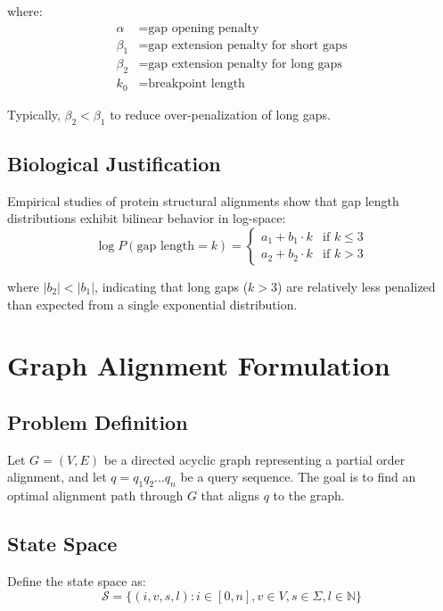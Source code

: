 \documentclass[11pt]{article}
\begin{document}
where:
\begin{align}
\alpha &= \text{gap opening penalty} \\
\beta_1 &= \text{gap extension penalty for short gaps} \\
\beta_2 &= \text{gap extension penalty for long gaps} \\
k_0 &= \text{breakpoint length}
\end{align}

Typically, $\beta_2 < \beta_1$ to reduce over-penalization of long gaps.

\subsection{Biological Justification}

Empirical studies of protein structural alignments show that gap length distributions exhibit bilinear behavior in log-space:
\begin{equation}
\log P(\text{gap length} = k) = \begin{cases}
a_1 + b_1 \cdot k & \text{if } k \leq 3 \\
a_2 + b_2 \cdot k & \text{if } k > 3
\end{cases}
\end{equation}

where $|b_2| < |b_1|$, indicating that long gaps ($k > 3$) are relatively less penalized than expected from a single exponential distribution.

\section{Graph Alignment Formulation}

\subsection{Problem Definition}

Let $G = (V, E)$ be a directed acyclic graph representing a partial order alignment, and let $q = q_1q_2...q_n$ be a query sequence. The goal is to find an optimal alignment path through $G$ that aligns $q$ to the graph.

\subsection{State Space}

Define the state space as:
\begin{equation}
\mathcal{S} = \{(i, v, s, l) : i \in [0,n], v \in V, s \in \Sigma, l \in \mathbb{N}\}
\end{equation}
\end{document}

